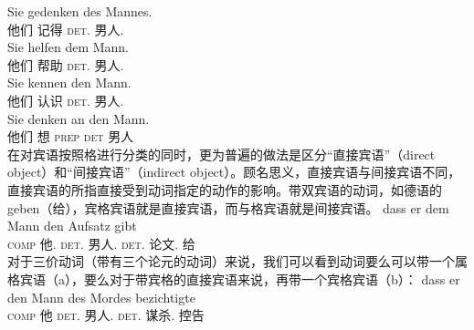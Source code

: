 \eal
\ex 
\gll Sie gedenken des Mannes.\\
	 他们 记得 \textsc{det}.\gen{} 男人.\gen{}\\
\ex 
\gll Sie helfen dem Mann.\\
	 他们 帮助 \textsc{det}.\dat{} 男人.\dat{}\\
\ex 
\gll Sie kennen den Mann.\\
	 他们 认识 \textsc{det}.\acc{} 男人.\acc{}\\
\ex 
\gll Sie denken an den Mann.\\
	 他们 想 \textsc{prep} \textsc{det} 男人\\
\zl
在对宾语按照格进行分类的同时，更为普遍的做法是区分“直接宾语”（direct object）和“间接宾语”（indirect object）。顾名思义，直接宾语与间接宾语不同，直接宾语的所指直接受到动词指定的动作的影响。带双宾语的动词，如德语的geben（给），宾格宾语就是直接宾语，而与格宾语就是间接宾语。
\ea
\gll dass er dem Mann den Aufsatz gibt\\
	 \textsc{comp} 他.\nom{} \textsc{det}.\dat{} 男人.\dat{} \textsc{det}.\acc{} 论文.\acc{} 给\\
\z
对于三价动词（带有三个论元的动词）来说，我们可以看到动词要么可以带一个属格宾语（a），要么对于带宾格的直接宾语来说，再带一个宾格宾语（b）：
\eal
\ex 
\gll dass er den Mann des Mordes bezichtigte\\
	 \textsc{comp} 他 \textsc{det}.\acc{} 男人.\acc{} \textsc{det}.\gen{} 谋杀.\gen{} 控告\\

